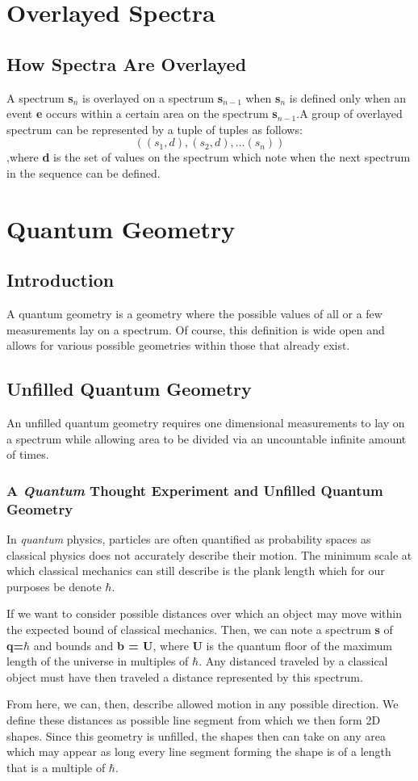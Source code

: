 \documentclass[12pt]{scrreprt}
\begin{document}
\chapter{Overlayed Spectra}
\section{How Spectra Are Overlayed}
A spectrum \textbf{s$_n$} is overlayed on a spectrum \textbf{s$_{n-1}$} when  \textbf{s$_n$} is defined only when an event \textbf{e} occurs within a certain area on the spectrum \textbf{s$_{n-1}$}.A group of overlayed spectrum can be represented by a tuple of tuples as follows: 
   \begin{equation} ((s_1,d),(s_2,d),...(s_n))\end{equation},where \textbf{d} is the set of values on the spectrum which note when the next spectrum in the sequence can be defined.
\chapter{Quantum Geometry}
\section{Introduction}
A quantum geometry is a geometry where the possible values of all or a few measurements lay on a spectrum. Of course, this definition is wide open and allows for various possible geometries within those that already exist.
\section{Unfilled Quantum Geometry}
An unfilled quantum geometry requires one dimensional measurements to lay on a spectrum while allowing area to be divided via an uncountable infinite amount of times. 
\subsection{A \textit{Quantum} Thought Experiment and Unfilled Quantum Geometry}
In \textit{quantum} physics, particles are often quantified as probability spaces as classical physics does not accurately describe their motion. The minimum scale at which classical mechanics can still describe is the plank length which for our purposes be denote $\hbar$. 
\par If we want to consider possible distances over which an object may move within the expected bound of classical mechanics. Then, we can note a spectrum \textbf{s} of \textbf{q=$\hbar$} and bounds  and \textbf{b = U}, where \textbf{U} is the quantum floor of the maximum length of the universe in multiples of $\hbar$. Any distanced traveled by a classical object must have then traveled a distance represented by this spectrum. 
\par From here, we can, then, describe allowed motion in any possible direction. We define these distances as possible line segment from which we then form 2D shapes. Since this geometry is unfilled, the shapes then can take on any area which may appear as long every line segment forming the shape is of a length that is a multiple of $\hbar$.
\end{document}
